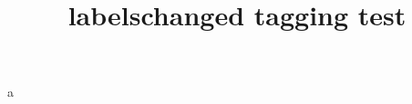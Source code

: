 \documentclass{article}
\title{labelschanged tagging test}
\begin{document}
\providecommand\r@foo{{1}{1}}
\edef\@currentlabel{.\expandafter\@firstoftwo\r@foo}
\label{foo}
a
\end{document}
